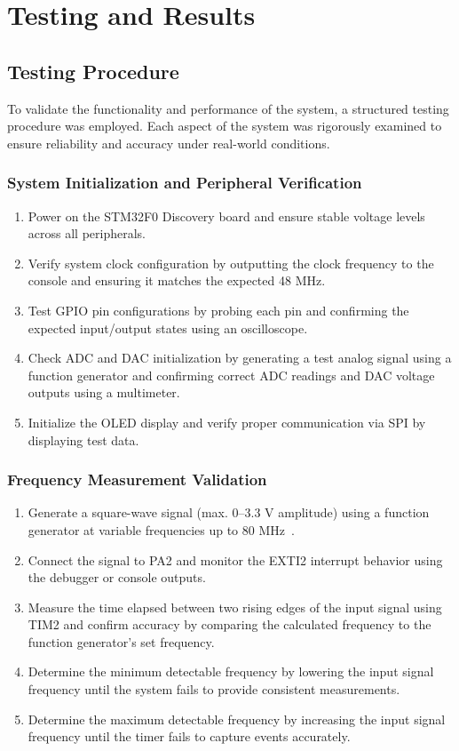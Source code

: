\section{Testing and Results}
\subsection{Testing Procedure}
To validate the functionality and performance of the system, a structured testing procedure was employed. Each aspect of the system was rigorously examined to ensure reliability and accuracy under real-world conditions.

\subsubsection{System Initialization and Peripheral Verification}
\begin{enumerate}[leftmargin=2em]
    \item Power on the STM32F0 Discovery board and ensure stable voltage levels across all peripherals.
    \item Verify system clock configuration by outputting the clock frequency to the console and ensuring it matches the expected 48 MHz.
    \item Test GPIO pin configurations by probing each pin and confirming the expected input/output states using an oscilloscope.
    \item Check ADC and DAC initialization by generating a test analog signal using a function generator and confirming correct ADC readings and DAC voltage outputs using a multimeter.
    \item Initialize the OLED display and verify proper communication via SPI by displaying test data.
\end{enumerate}

\subsubsection{Frequency Measurement Validation}
\begin{enumerate}[leftmargin=2em]
    \item Generate a square-wave signal (max. 0–3.3 V amplitude) using a function generator at variable frequencies up to 80 MHz~\cite{uvic_equipment_handbook}.
    \item Connect the signal to PA2 and monitor the EXTI2 interrupt behavior using the debugger or console outputs.
    \item Measure the time elapsed between two rising edges of the input signal using TIM2 and confirm accuracy by comparing the calculated frequency to the function generator's set frequency.
    \item Determine the minimum detectable frequency by lowering the input signal frequency until the system fails to provide consistent measurements.
    \item Determine the maximum detectable frequency by increasing the input signal frequency until the timer fails to capture events accurately.
\end{enumerate}



